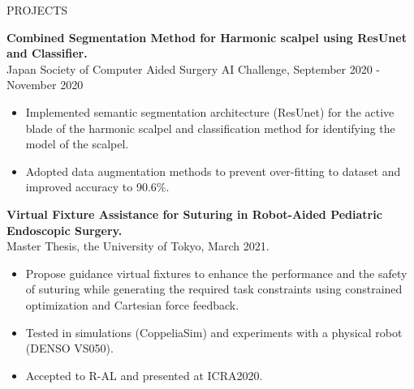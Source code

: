 \documentclass{resume} %
\begin{document}
\begin{rSection}{PROJECTS}
\begin{itemize}
\end{itemize}
\item \textbf{Combined Segmentation Method for Harmonic scalpel using ResUnet and Classifier.}\\
Japan Society of Computer Aided Surgery AI Challenge, September 2020 - November 2020
\begin{itemize}
\itemsep -3pt {} 
\item Implemented semantic segmentation architecture (ResUnet) for the active blade of the harmonic scalpel and classification method for identifying the model of the scalpel.
    \item Adopted data augmentation methods to prevent over-fitting to dataset and improved accuracy to 90.6\%.
\end{itemize}
\item \textbf{Virtual Fixture Assistance for Suturing in Robot-Aided Pediatric Endoscopic Surgery.}\\
Master Thesis, the University of Tokyo, March 2021.
\begin{itemize}
\itemsep -3pt {} 
    \item Propose guidance virtual fixtures to enhance the performance and the safety of suturing while generating the required task constraints using constrained optimization and Cartesian force feedback. 
    \item Tested in simulations (CoppeliaSim) and experiments with a physical robot (DENSO VS050).
    \item Accepted to R-AL and presented at ICRA2020.
\end{itemize}
\end{rSection} 
\end{document}
